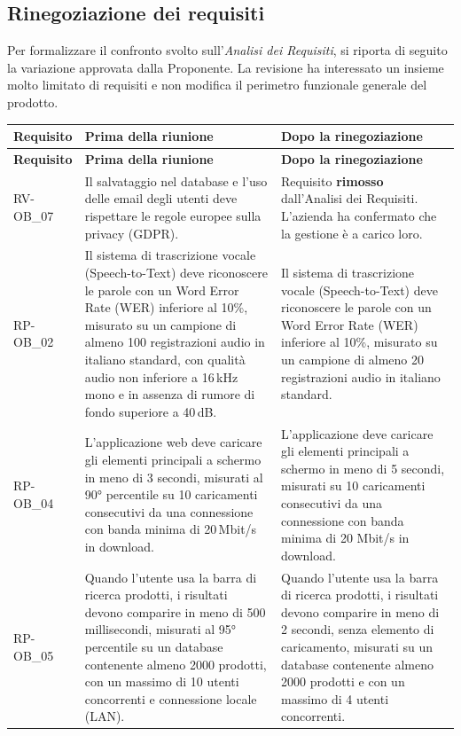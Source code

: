\documentclass[a4paper, 11pt, oneside]{scrartcl}
\begin{document}
\newpage
\subsection{Rinegoziazione dei requisiti}
Per formalizzare il confronto svolto sull'\textit{Analisi dei Requisiti}, si riporta di seguito la variazione approvata dalla Proponente. La revisione ha interessato un insieme molto limitato di requisiti e non modifica il perimetro funzionale generale del prodotto.

\renewcommand{\arraystretch}{1.2}
\footnotesize
\begin{longtable}{|>{\raggedright\arraybackslash}p{}|>{\raggedright\arraybackslash}p{}|>{\raggedright\arraybackslash}p{}|}
	\hline
	\rowcolor[gray]{0.9}
	\textbf{Requisito} & \textbf{Prima della riunione} & \textbf{Dopo la rinegoziazione} \\
	\hline
	\endfirsthead
	\hline
	\rowcolor[gray]{0.9}
	\textbf{Requisito} & \textbf{Prima della riunione} & \textbf{Dopo la rinegoziazione} \\
	\hline
	\endhead
	RV-OB\_07 & Il salvataggio nel database e l'uso delle email degli utenti deve rispettare le regole europee sulla privacy (GDPR). & Requisito \textbf{rimosso} dall'Analisi dei Requisiti. L'azienda ha confermato che la gestione è a carico loro.\\
	\hline
	RP-OB\_02 & Il sistema di trascrizione vocale (Speech-to-Text) deve riconoscere le parole con un Word Error Rate (WER) inferiore al 10\%, misurato su un campione di almeno 100 registrazioni audio in italiano standard, con qualità audio non inferiore a 16\,kHz mono e in assenza di rumore di fondo superiore a 40\,dB. & Il sistema di trascrizione vocale (Speech-to-Text) deve riconoscere le parole con un Word Error Rate (WER) inferiore al 10\%, misurato su un campione di almeno 20 registrazioni audio in italiano standard. \\
	\hline
	RP-OB\_04 & L'applicazione web deve caricare gli elementi principali a schermo in meno di 3 secondi, misurati al 90° percentile su 10 caricamenti consecutivi da una connessione con banda minima di 20\,Mbit/s in download. & L'applicazione deve caricare gli elementi principali a schermo in meno di 5 secondi, misurati su 10 caricamenti consecutivi da una connessione con banda minima di 20 Mbit/s in download. \\
	\hline
	RP-OB\_05 & Quando l'utente usa la barra di ricerca prodotti, i risultati devono comparire in meno di 500 millisecondi, misurati al 95° percentile su un database contenente almeno 2000 prodotti, con un massimo di 10 utenti concorrenti e connessione locale (LAN). & Quando l'utente usa la barra di ricerca prodotti, i risultati devono comparire in meno di 2 secondi, senza elemento di caricamento, misurati su un database contenente almeno 2000 prodotti e con un massimo di 4 utenti concorrenti. \\
	\hline
\end{longtable}
\normalsize
\end{document}
